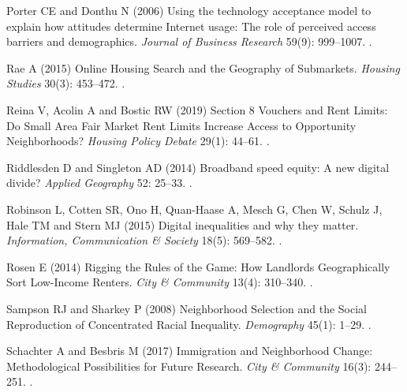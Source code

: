 \documentclass[11pt,letterpaper]{article}
\begin{document}
\begin{thebibliography}{77}
	Porter CE and Donthu N (2006) Using the technology acceptance model to explain
	how attitudes determine {Internet} usage: {The} role of perceived access
	barriers and demographics.
	\newblock \emph{Journal of Business Research} 59(9): 999--1007.
	\newblock {}.
	
	Rae A (2015) Online {Housing} {Search} and the {Geography} of {Submarkets}.
	\newblock \emph{Housing Studies} 30(3): 453--472.
	\newblock {}.
	
	Reina V, Acolin A and Bostic RW (2019) Section 8 {Vouchers} and {Rent}
	{Limits}: {Do} {Small} {Area} {Fair} {Market} {Rent} {Limits} {Increase}
	{Access} to {Opportunity} {Neighborhoods}?
	\newblock \emph{Housing Policy Debate} 29(1): 44--61.
	\newblock {}.
	
	Riddlesden D and Singleton AD (2014) Broadband speed equity: {A} new digital
	divide?
	\newblock \emph{Applied Geography} 52: 25--33.
	\newblock {}.
	
	Robinson L, Cotten SR, Ono H, Quan-Haase A, Mesch G, Chen W, Schulz J, Hale TM
	and Stern MJ (2015) Digital inequalities and why they matter.
	\newblock \emph{Information, Communication \& Society} 18(5): 569--582.
	\newblock {}.
	
	Rosen E (2014) Rigging the {Rules} of the {Game}: {How} {Landlords}
	{Geographically} {Sort} {Low}-{Income} {Renters}.
	\newblock \emph{City \& Community} 13(4): 310--340.
	\newblock {}.
	
	Sampson RJ and Sharkey P (2008) Neighborhood {Selection} and the {Social}
	{Reproduction} of {Concentrated} {Racial} {Inequality}.
	\newblock \emph{Demography} 45(1): 1--29.
	\newblock {}.
	
	Schachter A and Besbris M (2017) Immigration and {Neighborhood} {Change}:
	{Methodological} {Possibilities} for {Future} {Research}.
	\newblock \emph{City \& Community} 16(3): 244--251.
	\newblock {}.
	

\end{thebibliography}
\end{document}
